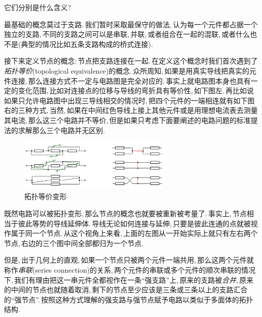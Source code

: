 它们分别是什么含义?

最基础的概念莫过于支路.\,我们暂时采取最保守的做法,\,认为每一个元件都占据一个独立的支路,\,不同的支路之间可以是串联,\,并联,\,或者组合在一起的混联,\,或者什么也不是(典型的情况比如五条支路构成的桥式连接).

接下来定义节点的概念:\,节点把支路连接在一起.\,在定义这个概念时我们首次遇到了\emph{拓扑等价}(topological equivalence)的概念.\,众所周知,\,如果是用真实导线把真实的元件连接,\,那么连接方式不一定与电路图是完全对应的.\,事实上就电路图本身也具有一定的变化范围,\,比如对连接点的位移与导线的弯折具有等价性,\,如下图左.\,再比如说如果只允许电路图中出现三导线相交的情况时,\,把四个元件的一端相连就有如下图右的三种方式,\,当然,\,如果在中间红色导线上接上其他元件或是用理想电流表去测量其电流,\,那么这三个电路并不等价,\,但是如果只考虑下面要阐述的电路问题的标准提法的求解那么三个电路并无区别.
\begin{figure}[H]
\centering
\includegraphics[width=0.65\textwidth]{image/7-3-15.png}
\caption{拓扑等价变形}
\end{figure}

既然电路可以被拓扑变形,\,那么节点的概念也就要被重新被考量了.\,事实上,\,节点相当于彼此等势的导线延伸体.\,导线无论如何连接与延伸,\,只要是彼此连通的点就被视作属于同一个节点.\,从这个视角上来看,\,上面的左图从一开始实际上就只有左右两个节点,\,右边的三个图中间全部都归为一个节点.

但是,\,出于几何上的直观,\,如果一个节点只被两个元件一端共用,\,那么这两个元件就称作\emph{串联}(series connection)的关系,\,两个元件的串联或多个元件的顺次串联的情况下,\,我们有理由把这一串元件全都视作在一条``强支路''上,\,原来的支路被\emph{合并},\,原来的中间的节点也就随着取消,\,剩下的节点至少应该是三条或三条以上的支路汇合的``强节点''.\,按照这种方式理解的强支路与强节点赋予电路以类似于多面体的拓扑结构.

